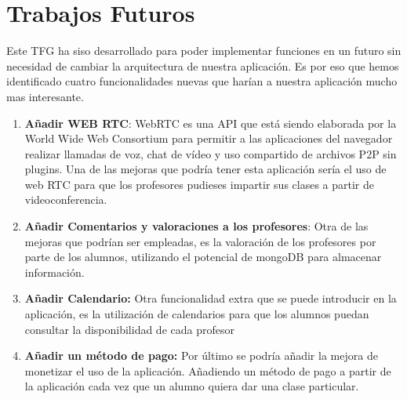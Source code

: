 \section{Trabajos Futuros }
Este TFG ha siso desarrollado para poder implementar funciones en un futuro sin necesidad de cambiar la arquitectura de nuestra aplicación. Es por eso que hemos identificado cuatro funcionalidades nuevas que harían a nuestra aplicación mucho mas interesante. 

\begin{enumerate}

    \item \textbf {Añadir WEB RTC}: WebRTC es una API que está siendo elaborada por la World Wide Web Consortium para permitir a las aplicaciones del navegador realizar llamadas de voz, chat de vídeo y uso compartido de archivos P2P sin plugins. Una de las mejoras que podría tener esta aplicación sería el uso de web RTC para que los profesores pudieses impartir sus clases a partir de videoconferencia.
    
    \item \textbf {Añadir Comentarios y valoraciones a los profesores}: Otra de las mejoras que podrían ser empleadas, es la valoración de los profesores por parte de los alumnos, utilizando el potencial de mongoDB para almacenar información. 
    
    \item \textbf {Añadir Calendario: } Otra funcionalidad extra que se puede introducir en la aplicación, es la utilización de calendarios para que los alumnos puedan consultar la disponibilidad de cada profesor  
    
    \item \textbf {Añadir un método de pago:} Por último se podría añadir la mejora de monetizar el uso de la aplicación. Añadiendo un método de pago a partir de la aplicación cada vez que un alumno quiera dar una clase particular.
    

\end{enumerate}
